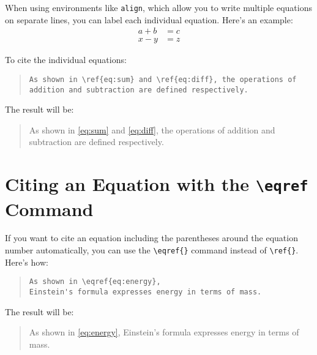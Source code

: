 When using environments like \verb|align|, which allow you to write multiple equations on separate lines, you can label each individual equation. Here's an example:
\begin{align}
\label{eq:sum}
    a + b & = c \\
\label{eq:diff}
    x - y & = z
\end{align}

To cite the individual equations:

\begin{quote}
\begin{verbatim}
As shown in \ref{eq:sum} and \ref{eq:diff}, the operations of
addition and subtraction are defined respectively.
\end{verbatim}
\end{quote}

The result will be:

\begin{quote}
    As shown in \ref{eq:sum} and \ref{eq:diff},
    the operations of addition and subtraction
    are defined respectively.
\end{quote}

\section{Citing an Equation with the \texorpdfstring{\texttt{\textbackslash eqref}}{eqref} Command}

If you want to cite an equation including the parentheses around the equation number automatically, you can use the \verb|\eqref{}| command instead of \verb|\ref{}|. Here's how:

\begin{quote}
\begin{verbatim}
As shown in \eqref{eq:energy},
Einstein's formula expresses energy in terms of mass.
\end{verbatim}
\end{quote}

The result will be:

\begin{quote}
    As shown in \eqref{eq:energy},
    Einstein's formula expresses energy in terms of mass.
\end{quote}
